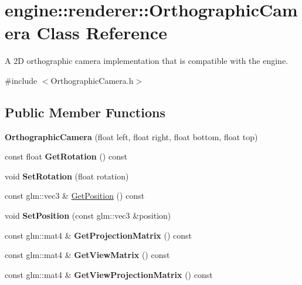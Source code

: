 \hypertarget{classengine_1_1renderer_1_1OrthographicCamera}{}\section{engine\+:\+:renderer\+:\+:Orthographic\+Camera Class Reference}
\label{classengine_1_1renderer_1_1OrthographicCamera}


A 2D orthographic camera implementation that is compatible with the engine.  




{\ttfamily \#include $<$Orthographic\+Camera.\+h$>$}

\subsection*{Public Member Functions}
\begin{DoxyCompactItemize}
\item 
\mbox{\label{classengine_1_1renderer_1_1OrthographicCamera_a228f46c7edc29cad66ab2693b1768152}} 
{\bfseries Orthographic\+Camera} (float left, float right, float bottom, float top)
\item 
\mbox{\label{classengine_1_1renderer_1_1OrthographicCamera_a9f7546e518ce254cff2f30de5714c08b}} 
const float {\bfseries Get\+Rotation} () const
\item 
\mbox{\label{classengine_1_1renderer_1_1OrthographicCamera_a0a7eabca5e51da70aa5ac5ed1966fd57}} 
void {\bfseries Set\+Rotation} (float rotation)
\item 
const glm\+::vec3 \& \hyperlink{classengine_1_1renderer_1_1OrthographicCamera_a89c74cc6487f626475fa5735c153fb16}{Get\+Position} () const
\item 
\mbox{\label{classengine_1_1renderer_1_1OrthographicCamera_aa6e9fffb139986784e7274d45e2fa7f5}} 
void {\bfseries Set\+Position} (const glm\+::vec3 \&position)
\item 
\mbox{\label{classengine_1_1renderer_1_1OrthographicCamera_a92416715f650aeed1b2f376e16d9337b}} 
const glm\+::mat4 \& {\bfseries Get\+Projection\+Matrix} () const
\item 
\mbox{\label{classengine_1_1renderer_1_1OrthographicCamera_a4c9377b5a0c57001f826e4a8b77753de}} 
const glm\+::mat4 \& {\bfseries Get\+View\+Matrix} () const
\item 
\mbox{\label{classengine_1_1renderer_1_1OrthographicCamera_a81a6f821fdbd83d5cb5263f2c90dbe1d}} 
const glm\+::mat4 \& {\bfseries Get\+View\+Projection\+Matrix} () const
\end{DoxyCompactItemize}


